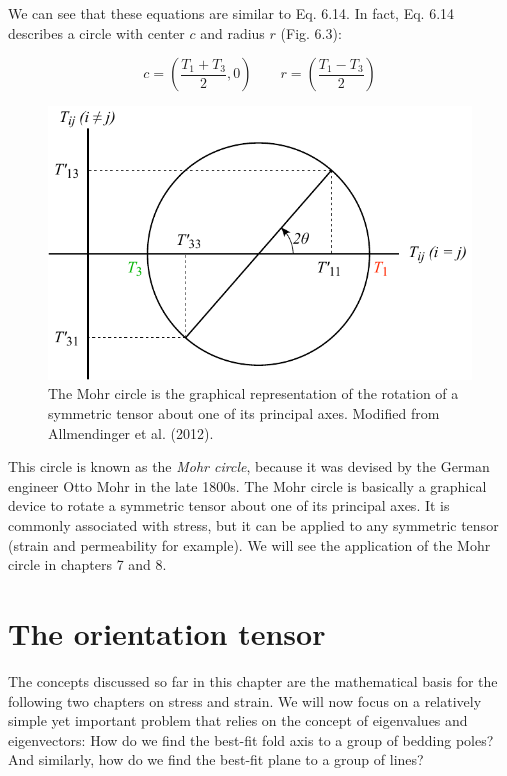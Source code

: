 \documentclass[a4paper , 12pt]{book}
\begin{document}
We can see that these equations are similar to Eq. 6.14. In fact, Eq. 6.14 describes a circle with center $c$ and radius $r$ (Fig. 6.3):

\begin{equation}
    c = \left(\frac{T_1+T_3}{2},0\right)\qquad r = \left(\frac{T_1-T_3}{2}\right)
\end{equation}

\begin{figure}[ht]
    \centering
    \includegraphics{ch6f3.pdf}
    \caption{The Mohr circle is the graphical representation of the rotation of a symmetric tensor about one of its principal axes. Modified from Allmendinger et al. (2012).}
\end{figure}

This circle is known as the \textit{Mohr circle}, because it was devised by the German engineer Otto Mohr in the late 1800s. The Mohr circle is basically a graphical device to rotate a symmetric tensor about one of its principal axes. It is commonly associated with stress, but it can be applied to any symmetric tensor (strain and permeability for example). We will see the application of the Mohr circle in chapters 7 and 8.

\section{The orientation tensor}

The concepts discussed so far in this chapter are the mathematical basis for the following two chapters on stress and strain. We will now focus on a relatively simple yet important problem that relies on the concept of eigenvalues and eigenvectors: How do we find the best-fit fold axis to a group of bedding poles? And similarly, how do we find the best-fit plane to a group of lines?
\end{document}
